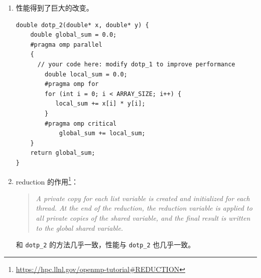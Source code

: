 \documentclass[12pt,a4paper]{article}
\newenvironment{problems}{\begin{list}{}{\renewcommand{\makelabel}[1]{\textbf{##1}.\hfil}}}{\end{list}}
\begin{document}
\begin{problems}
\begin{enumerate}
		\item 性能得到了巨大的改变。
		\begin{lstlisting}
double dotp_2(double* x, double* y) {
    double global_sum = 0.0;
    #pragma omp parallel
    {
      // your code here: modify dotp_1 to improve performance
        double local_sum = 0.0;
        #pragma omp for
        for (int i = 0; i < ARRAY_SIZE; i++) {
           local_sum += x[i] * y[i];
        }
        #pragma omp critical
            global_sum += local_sum;
    }
    return global_sum;
}
		\end{lstlisting}

		\item reduction 的作用\footnote{\href{https://hpc.llnl.gov/openmp-tutorial\#REDUCTION}{https://hpc.llnl.gov/openmp-tutorial\#REDUCTION}}：
		\begin{quotation}\itshape
			A private copy for each list variable is created and initialized for each thread. At the end of the reduction, the reduction variable is applied to all private copies of the shared variable, and the final result is written to the global shared variable.
		\end{quotation}

		和 \verb"dotp_2" 的方法几乎一致，性能与 \verb"dotp_2" 也几乎一致。

	\end{enumerate}
\end{problems}
\end{document}
